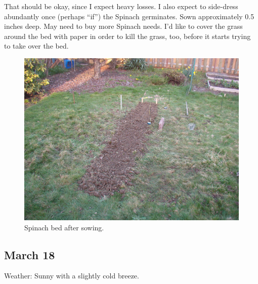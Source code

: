\documentclass{article}
\begin{document}
That should be okay, since I expect heavy losses. I also expect to side-dress abundantly once (perhaps ``if'') the Spinach germinates. Sown approximately 0.5 inches deep. May need to buy more Spinach needs. I'd like to cover the grass around the bed with paper in order to kill the grass, too, before it starts trying to take over the bed. \\
\begin{figure}
\protect \includegraphics[scale=0.20]{pics/0317_bed.jpg}
\caption{Spinach bed after sowing.}
\end{figure}

\subsection*{March 18}
Weather: Sunny with a slightly cold breeze.
\end{document}
